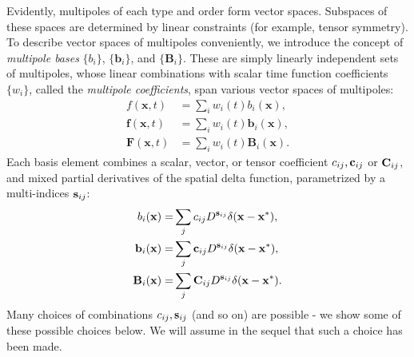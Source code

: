 Evidently, multipoles of each type and order form vector spaces. Subspaces of
these spaces are determined by linear constraints (for example, tensor
symmetry). To describe vector spaces of multipoles conveniently, we introduce the concept of
{\em multipole bases} $\{b_i\}$, $\{\mathbf b_i\}$, and $\{\mathbf
B_i\}$. These are simply linearly independent sets of multipoles, whose
linear combinations with scalar time function coefficients $\{w_i\}$, called the
{\em multipole coefficients}, span various vector spaces of multipoles:
\begin{equation}\label{eq:MPS}
\begin{split}
        f(\mathbf x,t) &= \sum_{i} w_i(t) b_i(\mathbf x),\\
        \mathbf f(\mathbf x,t) &= \sum_{i} w_i(t) \mathbf b_i(\mathbf x),\\
        \mathbf F(\mathbf x,t) &= \sum_{i} w_i(t) \mathbf B_i(\mathbf x).
\end{split}
\end{equation}
Each basis element combines a scalar, vector, or tensor
coefficient $c_{ij},{\bf c}_{ij}$ or ${\bf C}_{ij}$, and mixed partial
derivatives of the spatial delta function, parametrized by a multi-indices ${\bf
  s}_{ij}$:
\begin{equation}\label{eq:realdefn}
\begin{split}
	b_i(\bf x) = & \sum_j c_{ij} D^{{\bf s}_{ij}}\delta({\bf x}-{\bf x^*}),  \\
	{\bf b}_i(\bf x) =& \sum_j {\bf c}_{ij} D^{{\bf s}_{ij}}\delta({\bf x}-{\bf x^*}), \\
	{\bf B}_i(\bf x) =& \sum_j {\bf C}_{ij} D^{{\bf s}_{ij}}\delta({\bf x}-{\bf x^*}). 
\end{split}
\end{equation}
Many choices of combinations $c_{ij},{\bf s}_{ij}$ (and so on) are
possible - we show some of these possible choices below. We will assume in the sequel
that such a choice has been made.

